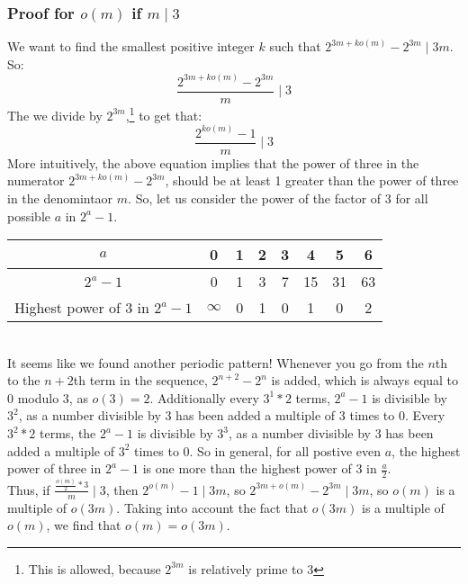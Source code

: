 \documentclass{article}
\begin{document}
  \subsubsection{Proof for $o(m)$ if $m \mid 3$}
  We want to find the smallest positive integer $k$ such that $2^{3m + ko(m)} - 2^{3m} \mid 3m$. So:
  \begin{equation}
    \frac{2^{3m + ko(m)} - 2^{3m}}{m} \mid 3
  \end{equation}
   The we divide by $2^{3m}$,\footnote{This is allowed, because $2^{3m}$ is relatively prime to 3} to get that:
  \begin{equation}
    \frac{2^{ko(m)}-1}{m} \mid 3
  \end{equation}
  More intuitively, the above equation implies that the power of three in the numerator $2^{3m + ko(m)}-2^{3m}$, should be at least 1 greater than the power of three in the denomintaor $m$. So, let us consider the power of the factor of 3 for all possible $a$ in $2^a-1$.\\
  \begin{tabular} {|c|c|c|c|c|c|c|c|}
    \hline $a$                             & 0 & 1 & 2 & 3 & 4  &  5 & 6 \\
    \hline $2^a-1$                         & 0 & 1 & 3 & 7 & 15 & 31 & 63\\
    \hline Highest power of 3 in $2^a-1$   & $\infty$ & 0 & 1 & 0 & 1  & 0  & 2 \\
    \hline 
  \end{tabular}\\
  
  It seems like we found another periodic pattern! Whenever you go from the $n$th to the $n+2$th term in the sequence, $2^{n+2} - 2^n$ is added, which is always equal to 0 modulo 3, as $o(3) = 2$. Additionally every $3^1*2$ terms, $2^a-1$ is divisible by $3^2$, as a number divisible by 3 has been added a multiple of 3 times to 0. Every $3^2*2$ terms, the $2^a-1$ is divisible by $3^3$, as a number divisible by 3 has been added a multiple of $3^2$ times to 0. So in general, for all postive even $a$, the highest power of three in $2^a - 1$ is one more than the highest power of 3 in $\frac{a}{2}$.\\

  Thus, if $\frac{\frac{o(m)}{2} * 3}{m} \mid 3$, then $2^{o(m)}-1 \mid 3m$, so $2^{3m + o(m)}-2^{3m} \mid 3m$, so $o(m)$ is a multiple of $o(3m)$. Taking into account the fact that $o(3m)$ is a multiple of $o(m)$, we find that $o(m)= o(3m)$.\\
\end{document}
